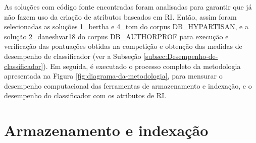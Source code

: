     

    As soluções com código fonte encontradas foram analisadas para garantir que já não fazem uso da criação de atributos baseados em RI.
    Então, assim foram selecionadas as soluções 1\_bertha e 4\_tom do corpus DB\_HYPARTISAN, e a solução 2\_daneshvar18 do corpus DB_AUTHORPROF para execução e verificação das pontuações obtidas na competição e obtenção das medidas de desempenho de classificador (ver a Subseção \ref{subsec:Desempenho-de-classificador}).
    Em seguida, é executado o processo completo da metodologia apresentada na Figura \ref{fig:diagrama-da-metodologia}, para mensurar o desempenho computacional das ferramentas de armazenamento e indexação, e o desempenho do classificador com os atributos de RI.
    
    
\section{Armazenamento e indexação} \label{sec:Armazenamento-e-indexação}

